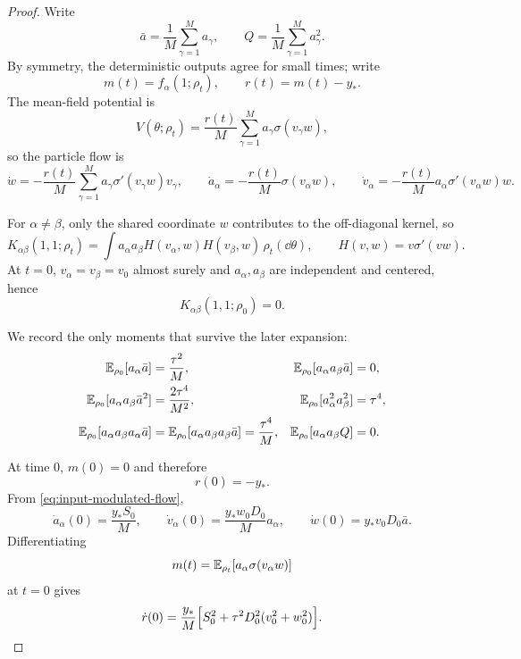 \begin{proof}
Write
\[
  \bar a=\frac1M\sum_{\gamma=1}^M a_\gamma,
  \qquad
  Q=\frac1M\sum_{\gamma=1}^M a_\gamma^2.
\]
By symmetry, the deterministic outputs agree for small times; write
\[
  m(t)=f_\alpha(1;\rho_t),
  \qquad
  r(t)=m(t)-y_*.
\]
The mean-field potential is
\[
  V(\theta;\rho_t)
  =
  \frac{r(t)}{M}
  \sum_{\gamma=1}^M a_\gamma \sigma(v_\gamma w),
\]
so the particle flow is
\begin{equation}
  \dot w
  =
  -\frac{r(t)}{M}\sum_{\gamma=1}^M a_\gamma \sigma'(v_\gamma w)v_\gamma,
  \qquad
  \dot a_\alpha
  =
  -\frac{r(t)}{M}\sigma(v_\alpha w),
  \qquad
  \dot v_\alpha
  =
  -\frac{r(t)}{M}a_\alpha \sigma'(v_\alpha w)w.
  \label{eq:input-modulated-flow}
\end{equation}

For $\alpha\neq\beta$, only the shared coordinate $w$ contributes to the off-diagonal kernel, so
\begin{equation}
  K_{\alpha\beta}(1,1;\rho_t)
  =
  \int
  a_\alpha a_\beta
  H(v_\alpha,w)H(v_\beta,w)\,
  \rho_t(\dd \theta),
  \qquad
  H(v,w)=v\sigma'(vw).
  \label{eq:input-modulated-kernel}
\end{equation}
At $t=0$, $v_\alpha=v_\beta=v_0$ almost surely and $a_\alpha,a_\beta$ are independent and centered, hence
\[
  K_{\alpha\beta}(1,1;\rho_0)=0.
  \label{eq:input-modulated-zero}
\]

We record the only moments that survive the later expansion:
\begin{align}
  \mathbb{E}_{\rho_0}[a_\alpha \bar a]
  &=
  \frac{\tau^2}{M},
  &
  \mathbb{E}_{\rho_0}[a_\alpha a_\beta \bar a]
  &=
  0,
  \label{eq:input-modulated-moments-1}
  \\
  \mathbb{E}_{\rho_0}[a_\alpha a_\beta \bar a^2]
  &=
  \frac{2\tau^4}{M^2},
  &
  \mathbb{E}_{\rho_0}[a_\alpha^2 a_\beta^2]
  &=
  \tau^4,
  \label{eq:input-modulated-moments-2}
  \\
  \mathbb{E}_{\rho_0}[a_\alpha a_\beta a_\alpha \bar a]
  &=
  \mathbb{E}_{\rho_0}[a_\alpha a_\beta a_\beta \bar a]
  =
  \frac{\tau^4}{M},
  &
  \mathbb{E}_{\rho_0}[a_\alpha a_\beta Q]
  &=
  0.
  \label{eq:input-modulated-moments-3}
\end{align}

At time $0$, $m(0)=0$ and therefore
\[
  r(0)=-y_*.
\]
From \eqref{eq:input-modulated-flow},
\begin{equation}
  \dot a_\alpha(0)=\frac{y_*S_0}{M},
  \qquad
  \dot v_\alpha(0)=\frac{y_*w_0D_0}{M}a_\alpha,
  \qquad
  \dot w(0)=y_*v_0D_0\bar a.
  \label{eq:input-modulated-first}
\end{equation}
Differentiating
\[
  m(t)=\mathbb{E}_{\rho_t}[a_\alpha \sigma(v_\alpha w)]
\]
at $t=0$ gives
\begin{equation}
  \dot r(0)
  =
  \frac{y_*}{M}
  \Bigl[
    S_0^2+\tau^2D_0^2(v_0^2+w_0^2)
  \Bigr].
  \label{eq:input-modulated-rdot}
\end{equation}


\end{proof}
